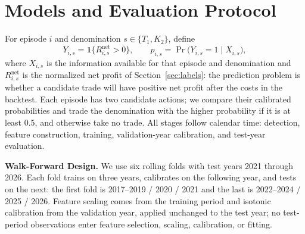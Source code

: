 \documentclass[sigconf,review,anonymous]{acmart}
\begin{document}
\section{Models and Evaluation Protocol}
\label{sec:method}

For episode $i$ and denomination $s\in\{T_1,K_2\}$, define
\[
Y_{i,s}=\mathbf 1\{R^{\mathrm{net}}_{i,s}>0\},
\qquad
p_{i,s}=
\Pr\big(Y_{i,s}=1\mid X_{i,s}\big),
\]
where $X_{i,s}$ is the information available for that episode and denomination and $R^{\mathrm{net}}_{i,s}$ is the normalized net profit of Section~\ref{sec:labels}: the prediction problem is whether a candidate trade will have positive net profit after the costs in the backtest. Each episode has two candidate actions; we compare their calibrated probabilities and trade the denomination with the higher probability if it is at least 0.5, and otherwise take no trade. All stages follow calendar time: detection, feature construction, training, validation-year calibration, and test-year evaluation.

\smallskip\noindent\textbf{Walk-Forward Design.}
We use six rolling folds with test years 2021 through 2026. Each fold trains on three years, calibrates on the following year, and tests on the next: the first fold is 2017--2019 / 2020 / 2021 and the last is 2022--2024 / 2025 / 2026. Feature scaling comes from the training period and isotonic calibration from the validation year, applied unchanged to the test year; no test-period observations enter feature selection, scaling, calibration, or fitting.
\end{document}
